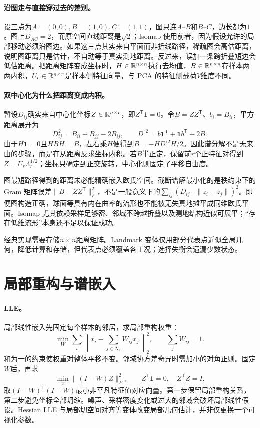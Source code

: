 \paragraph{沿图走与直接穿过去的差别。}
设三点为$A=(0,0),B=(1,0),C=(1,1)$，图只连$A$--$B$和$B$--$C$，边长都为$1$。图上$D_{AC}=2$，而原空间直线距离是$\sqrt2$；Isomap 使用前者，因为假设允许的局部移动必须沿图边。如果这三点其实来自平面而非折线路径，稀疏图会高估距离，说明图距离只是估计，不自动等于真实测地距离。反过来，误加一条跨折叠短边会低估距离。把距离矩阵变成坐标时，$H\in\mathbb{R}^{n\times n}$执行去均值，$B\in\mathbb{R}^{n\times n}$存样本两两内积，$U_r\in\mathbb{R}^{n\times r}$是样本侧特征向量，与 PCA 的特征侧载荷$V$维度不同。

\paragraph{双中心化为什么把距离变成内积。}
暂设$D_{ij}$确实来自中心化坐标$Z\in\mathbb{R}^{n\times r}$，即$Z^{\mathsf T}\mathbf1=0$。令$B=ZZ^{\mathsf T}$、$b_i=B_{ii}$，平方距离展开为
\begin{equation}
 D_{ij}^2=B_{ii}+B_{jj}-2B_{ij},\qquad
 D^{\circ2}=b\mathbf1^{\mathsf T}+\mathbf1b^{\mathsf T}-2B.
\end{equation}
由于$H\mathbf1=0$且$HBH=B$，左右乘$H$便得到$B=-HD^{\circ2}H/2$。因此谱分解不是无来由的步骤，而是在从距离反求坐标内积。若$B$半正定，保留前$r$个正特征对得到$Z=U_r\Lambda_r^{1/2}$；坐标只确定到正交旋转，中心化则固定了平移自由度。

图最短路径得到的距离未必能精确嵌入欧氏空间。截断谱解最小化的是秩约束下的 Gram 矩阵误差$\|B-ZZ^{\mathsf T}\|_F^2$，不是一般意义下的$\sum_{ij}(D_{ij}-\|z_i-z_j\|)^2$。即便图构造正确，球面等具有内在曲率的流形也不能被无失真地摊平成同维欧氏平面。Isomap 尤其依赖采样足够密、邻域不跨越折叠以及测地结构近似可展平；“存在低维流形”本身还不足以保证成功。

经典实现需要存储$n\times n$距离矩阵。Landmark 变体仅用部分代表点近似全局几何，降低计算和存储，但代表点必须覆盖各工况；选择失衡会遗漏少数状态。

\section{局部重构与谱嵌入}
\paragraph{LLE。}
局部线性嵌入先固定每个样本的邻居，求局部重构权重\cite{roweis2000lle}：
\begin{equation}
 \min_W\sum_i\left\|x_i-\sum_{j\in\mathcal N_i}W_{ij}x_j\right\|_2^2,
 \qquad \sum_jW_{ij}=1.
\end{equation}
和为一的约束使权重对整体平移不变。邻域协方差奇异时需加小的对角正则。固定$W$后，再求
\begin{equation}
 \min_Z\|(I-W)Z\|_F^2,\qquad
 Z^{\mathsf T}\mathbf1=0,\quad Z^{\mathsf T}Z=I.
\end{equation}
取$(I-W)^{\mathsf T}(I-W)$最小非平凡特征值对应向量。第一步保留局部重构关系，第二步避免坐标全部坍缩。噪声、采样密度变化或过大的邻域会破坏局部线性假设。Hessian LLE 与局部切空间对齐等变体改变局部几何估计，并非仅更换一个可视化参数\cite{donoho2003hessian,zhang2004ltsa}。

